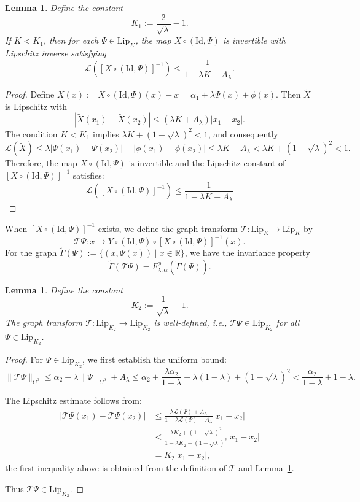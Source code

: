 \documentclass{amsart}
\newcommand{\R}{\mathbb{R}}
\newcommand{\Lip}{\mathrm{Lip}}
\newcommand{\la}{\lambda}
\newcommand{\al}{\alpha}
\newtheorem{Lemma}[Definition]{Lemma}
\begin{document}
	\begin{Lemma}\label{invertib}
		Define the constant
		\[
		K_1 := \frac{2}{\sqrt{\lambda}} - 1.
		\]
		If $K < K_1$, then for each $\Psi \in \Lip_K$, the map $X \circ (\mathrm{Id}, \Psi)$ is invertible with Lipschitz inverse satisfying
		\[
		\mathcal{L}\left([X \circ (\mathrm{Id}, \Psi)]^{-1}\right) \leq \frac{1}{1 - \lambda K - A_\lambda}.
		\]
	\end{Lemma}
	
	\begin{proof}
		Define $\tilde{X}(x) := X \circ (\mathrm{Id}, \Psi)(x) - x=\alpha_1+\lambda\Psi(x)+\phi(x)$. Then $\tilde{X}$ is Lipschitz with
		\[
		|\tilde{X}(x_1) - \tilde{X}(x_2)| \leq (\lambda K + A_\lambda)|x_1 - x_2|.
		\]
		The condition $K < K_1$ implies $\lambda K + (1 - \sqrt{\lambda})^2 < 1$, and consequently
		\[
		\mathcal{L}(\tilde{X}) \leq \lambda|\Psi(x_1)-\Psi(x_2)|+|\phi(x_1)-\phi(x_2)|\leq \lambda K + A_\lambda < \lambda K + (1 - \sqrt{\lambda})^2 < 1.
		\]
		Therefore, the map $X\circ(\mathrm{Id},\Psi)$ is invertible and the Lipschitz constant of $[X\circ(\mathrm{Id},\Psi)]^{-1}$ satisfies:
		\[
		\mathcal{L}([X\circ(\mathrm{Id},\Psi)]^{-1})\leq \frac{1}{1-\lambda K -A_{\lambda}}
		\]
	\end{proof}
	
	When $[X \circ (\mathrm{Id}, \Psi)]^{-1}$ exists, we define the graph transform $\mathcal{T}: \Lip_K \to \Lip_K$ by
	\[
	\mathcal{T}\Psi : x \mapsto Y \circ (\mathrm{Id}, \Psi) \circ [X \circ (\mathrm{Id}, \Psi)]^{-1}(x).
	\]
	For the graph $\tilde{\Gamma}(\Psi) := \{(x, \Psi(x)) \mid x \in \R\}$, we have the invariance property
	\[
	\tilde{\Gamma}(\mathcal{T}\Psi) = {F_{\lambda,\alpha}^\phi}(\tilde{\Gamma}(\Psi)).
	\]
	
	\begin{Lemma}\label{welld}
		Define the constant
		\[
		K_2 := \frac{1}{\sqrt{\lambda}} - 1.
		\]
		The graph transform $\mathcal{T}: \Lip_{K_2} \to \Lip_{K_2}$ is well-defined, i.e., $\mathcal{T}\Psi \in \Lip_{K_2}$ for all $\Psi \in \Lip_{K_2}$.
	\end{Lemma}
	
	\begin{proof}
		For $\Psi \in \Lip_{K_2}$, we first establish the uniform bound:
		\[
		\|\mathcal{T}\Psi\|_{C^0} \leq \al_2+\lambda \|\Psi\|_{C^0} + A_\lambda \leq \al_2+\frac{\la\al_2}{1-\la}+\lambda(1-\lambda) + (1 - \sqrt{\lambda})^2 <\frac{\al_2}{1-\la}+ 1-\lambda.
		\]
		
		The Lipschitz estimate follows from:
		\begin{align*}
			|\mathcal{T}\Psi(x_1) - \mathcal{T}\Psi(x_2)|
			&\leq \frac{\lambda \mathcal{L}(\Psi) + A_\lambda}{1 - \lambda \mathcal{L}(\Psi) - A_\lambda}|x_1 - x_2| \\
			&< \frac{\lambda K_2 + (1 - \sqrt{\lambda})^2}{1 - \lambda K_2 - (1 - \sqrt{\lambda})^2}|x_1 - x_2| \\
			&= K_2 |x_1 - x_2|,
		\end{align*}
		the first inequality above is obtained from the definition of $\mathcal{T}$ and Lemma~\ref{invertib}.
		
		Thus $\mathcal{T}\Psi \in \Lip_{K_2}$.
	\end{proof}
	
\end{document}

